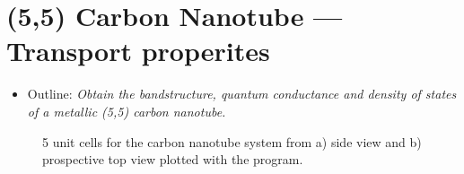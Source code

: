 \section{(5,5) Carbon Nanotube --- Transport properites}
\label{sec13:cnt}

\begin{itemize}
\item Outline: {\it Obtain the bandstructure, quantum conductance and density of states of a metallic (5,5)
carbon nanotube.}
\end{itemize}

\begin{figure}[h!]
\centering
{}
\centering
{}
\caption{5 unit cells for the carbon nanotube system from a) side view and b) prospective top view plotted with the \xcrysden{} program.}
\label{fig13.0}
\end{figure}


